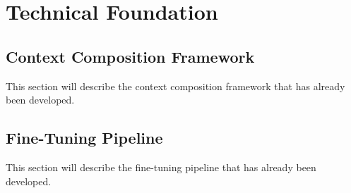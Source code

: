 \chapter{Technical Foundation}  %

\section{Context Composition Framework}

This section will describe the context composition framework that has already been developed.

\section{Fine-Tuning Pipeline}

This section will describe the fine-tuning pipeline that has already been developed.
